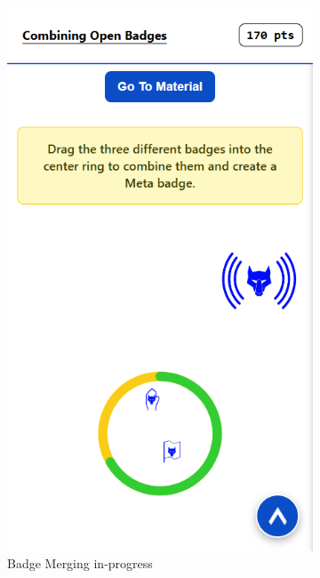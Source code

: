 \begin{figure}[H]
  \centering
  \begin{subfigure}[]{0.4\textwidth}
    \includegraphics[width=\textwidth]{Media/merge1.png}
    \caption{Badge Merging in-progress}
  \end{subfigure}
  \hfill
  \begin{subfigure}[]{0.4\textwidth}

\end{subfigure}
\end{figure}
